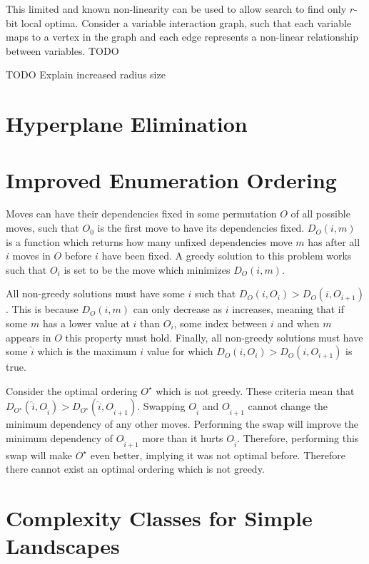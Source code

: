\documentclass[runningheads,a4paper]{llncs}
\begin{document}
This limited and known non-linearity can be used to allow search to find only $r$-bit
local optima. Consider a variable interaction graph, such that each variable maps
to a vertex in the graph and each edge represents a non-linear relationship between
variables. TODO

TODO Explain increased radius size~\cite{chicano:2014:ball}


\section{Hyperplane Elimination}

\section{Improved Enumeration Ordering}

Moves can have their dependencies fixed in some permutation $O$ of all possible moves,
such that $O_0$ is the first move to have its dependencies fixed.
$D_O(i, m)$ is a function which returns how many unfixed dependencies move $m$ has after all
$i$ moves in $O$ before $i$ have been fixed. A greedy solution to this problem works such
that $O_i$ is set to be the move which minimizes $D_O(i, m)$.

All non-greedy solutions must have some $i$ such that $D_O(i, O_i) > D_O(i, O_{i+1})$.
This is because $D_O(i, m)$ can only decrease as $i$ increases, meaning that if some $m$
has a lower value at $i$ than $O_i$, some index between $i$ and when $m$ appears in $O$
this property must hold. Finally, all non-greedy solutions must have some $\hat{i}$
which is the maximum $i$ value for which $D_O(i, O_i) > D_O(i, O_{i+1})$ is true. 

Consider the optimal ordering $O^\star$ which is not greedy.
These criteria mean that $D_{O^\star}(\hat{i}, O_{\hat{i}}) > D_{O^\star}(\hat{i}, O_{\hat{i}+1})$.
Swapping $O_{\hat{i}}$ and $O_{\hat{i}+1}$ cannot change the minimum dependency of any other moves.
Performing the swap will improve the minimum dependency of $O_{\hat{i}+1}$ more than it hurts
$O_{\hat{i}}$. Therefore, performing this swap will make $O^\star$ even better, implying it was
not optimal before. Therefore there cannot exist an optimal ordering which is not greedy.

\section{Complexity Classes for Simple Landscapes}
\end{document}
